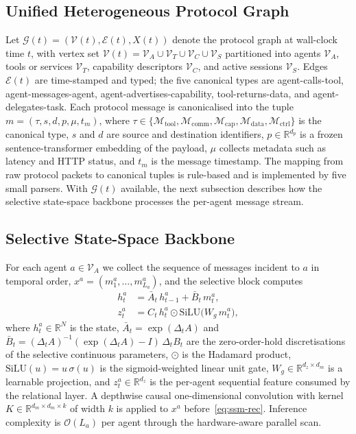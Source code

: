 \documentclass{ieeeaccess}
\newcommand{\R}{\mathbb{R}}
\newcommand{\calG}{\mathcal{G}}
\newcommand{\calM}{\mathcal{M}}
\newcommand{\calO}{\mathcal{O}}
\newcommand{\calV}{\mathcal{V}}
\newcommand{\calE}{\mathcal{E}}
\begin{document}
\subsection{Unified Heterogeneous Protocol Graph}
\label{sec:graph}
Let $\calG(t)=(\calV(t),\calE(t),X(t))$ denote the protocol graph at wall-clock time $t$, with vertex set $\calV(t)=\calV_{A}\cup\calV_{T}\cup\calV_{C}\cup\calV_{S}$ partitioned into agents $\calV_{A}$, tools or services $\calV_{T}$, capability descriptors $\calV_{C}$, and active sessions $\calV_{S}$. Edges $\calE(t)$ are time-stamped and typed; the five canonical types are agent-calls-tool, agent-messages-agent, agent-advertises-capability, tool-returns-data, and agent-delegates-task. Each protocol message is canonicalised into the tuple $m=(\tau,s,d,p,\mu,t_{m})$, where $\tau\in\{\calM_{\text{tool}},\calM_{\text{comm}},\calM_{\text{cap}},\calM_{\text{data}},\calM_{\text{ctrl}}\}$ is the canonical type, $s$ and $d$ are source and destination identifiers, $p\in\R^{d_{p}}$ is a frozen sentence-transformer embedding of the payload, $\mu$ collects metadata such as latency and HTTP status, and $t_{m}$ is the message timestamp. The mapping from raw protocol packets to canonical tuples is rule-based and is implemented by five small parsers. With $\calG(t)$ available, the next subsection describes how the selective state-space backbone processes the per-agent message stream.

\subsection{Selective State-Space Backbone}
\label{sec:backbone}
For each agent $a\in\calV_{A}$ we collect the sequence of messages incident to $a$ in temporal order, $x^{a}=(m^{a}_{1},\ldots,m^{a}_{L_{a}})$, and the selective block computes
\begin{align}
h^{a}_{t} &= \bar A_{t}\,h^{a}_{t-1} + \bar B_{t}\,m^{a}_{t}, \label{eq:ssm-rec}\\
z^{a}_{t} &= C_{t}\,h^{a}_{t} \odot \mathrm{SiLU}\bigl(W_{g}\,m^{a}_{t}\bigr), \label{eq:gate}
\end{align}
where $h^{a}_{t}\in\R^{N}$ is the state, $\bar A_{t}=\exp(\Delta_{t}A)$ and $\bar B_{t}=(\Delta_{t}A)^{-1}(\exp(\Delta_{t}A)-I)\,\Delta_{t}B_{t}$ are the zero-order-hold discretisations of the selective continuous parameters, $\odot$ is the Hadamard product, $\mathrm{SiLU}(u)=u\,\sigma(u)$ is the sigmoid-weighted linear unit gate, $W_{g}\in\R^{d_{z}\times d_{m}}$ is a learnable projection, and $z^{a}_{t}\in\R^{d_{z}}$ is the per-agent sequential feature consumed by the relational layer. A depthwise causal one-dimensional convolution with kernel $K\in\R^{d_{m}\times d_{m}\times k}$ of width $k$ is applied to $x^{a}$ before~\eqref{eq:ssm-rec}. Inference complexity is $\calO(L_{a})$ per agent through the hardware-aware parallel scan.
\end{document}
